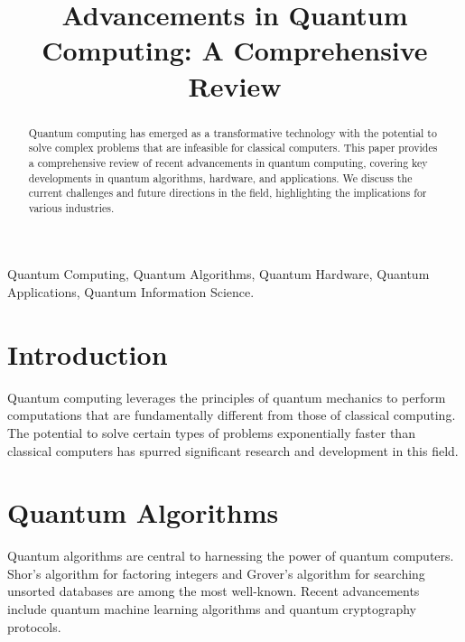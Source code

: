 \documentclass[conference]{IEEEtran}
\begin{document}
\title{Advancements in Quantum Computing: A Comprehensive Review}

\author{
}


\maketitle

\begin{abstract}
Quantum computing has emerged as a transformative technology with the potential to solve complex problems that are infeasible for classical computers. This paper provides a comprehensive review of recent advancements in quantum computing, covering key developments in quantum algorithms, hardware, and applications. We discuss the current challenges and future directions in the field, highlighting the implications for various industries.
\end{abstract}

\begin{IEEEkeywords}
Quantum Computing, Quantum Algorithms, Quantum Hardware, Quantum Applications, Quantum Information Science.
\end{IEEEkeywords}

\section{Introduction}
Quantum computing leverages the principles of quantum mechanics to perform computations that are fundamentally different from those of classical computing. The potential to solve certain types of problems exponentially faster than classical computers has spurred significant research and development in this field.

\section{Quantum Algorithms}
Quantum algorithms are central to harnessing the power of quantum computers. Shor's algorithm for factoring integers and Grover's algorithm for searching unsorted databases are among the most well-known. Recent advancements include quantum machine learning algorithms and quantum cryptography protocols.
\end{document}
